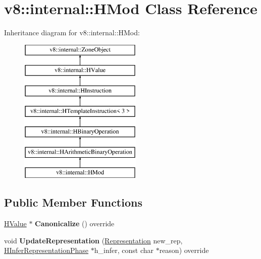 \hypertarget{classv8_1_1internal_1_1_h_mod}{}\section{v8\+:\+:internal\+:\+:H\+Mod Class Reference}
\label{classv8_1_1internal_1_1_h_mod}
Inheritance diagram for v8\+:\+:internal\+:\+:H\+Mod\+:\begin{figure}[H]
\begin{center}
\leavevmode
\includegraphics[height=7.000000cm]{classv8_1_1internal_1_1_h_mod}
\end{center}
\end{figure}
\subsection*{Public Member Functions}
\begin{DoxyCompactItemize}
\item 
\hyperlink{classv8_1_1internal_1_1_h_value}{H\+Value} $\ast$ {\bfseries Canonicalize} () override\hypertarget{classv8_1_1internal_1_1_h_mod_a399e4c62fa9cf674521758c0ce8072fb}{}\label{classv8_1_1internal_1_1_h_mod_a399e4c62fa9cf674521758c0ce8072fb}

\item 
void {\bfseries Update\+Representation} (\hyperlink{classv8_1_1internal_1_1_representation}{Representation} new\+\_\+rep, \hyperlink{classv8_1_1internal_1_1_h_infer_representation_phase}{H\+Infer\+Representation\+Phase} $\ast$h\+\_\+infer, const char $\ast$reason) override\hypertarget{classv8_1_1internal_1_1_h_mod_ab8d57e321af61bffb56e4f74131ceb5c}{}\label{classv8_1_1internal_1_1_h_mod_ab8d57e321af61bffb56e4f74131ceb5c}

\end{DoxyCompactItemize}
